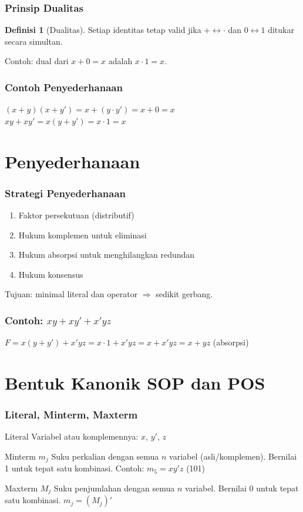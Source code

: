 \documentclass[handout]{beamer}
\theoremstyle{definition}
\newtheorem{definisi}[theorem]{Definisi}
\theoremstyle{example}
\begin{document}
\begin{frame}
\frametitle{Prinsip Dualitas}
\begin{definisi}[Dualitas]
Setiap identitas tetap valid jika $+ \leftrightarrow \cdot$ dan $0 \leftrightarrow 1$ ditukar secara simultan.
\end{definisi}
Contoh: dual dari $x+0=x$ adalah $x \cdot 1 = x$.
\end{frame}

\begin{frame}
\frametitle{Contoh Penyederhanaan}
$(x+y)(x+y') = x + (y \cdot y') = x + 0 = x$\\
$xy + xy' = x(y+y') = x \cdot 1 = x$
\end{frame}

\section{Penyederhanaan}

\begin{frame}
\frametitle{Strategi Penyederhanaan}
\begin{enumerate}
  \item Faktor persekutuan (distributif)
  \item Hukum komplemen untuk eliminasi
  \item Hukum absorpsi untuk menghilangkan redundan
  \item Hukum konsensus
\end{enumerate}
Tujuan: minimal literal dan operator $\Rightarrow$ sedikit gerbang.
\end{frame}

\begin{frame}
\frametitle{Contoh: $xy + xy' + x'yz$}
$F = x(y+y') + x'yz = x \cdot 1 + x'yz = x + x'yz = x + yz$ (absorpsi)
\end{frame}

\section{Bentuk Kanonik SOP dan POS}

\begin{frame}
\frametitle{Literal, Minterm, Maxterm}
\begin{block}{Literal}
Variabel atau komplemennya: $x$, $y'$, $z$
\end{block}
\begin{block}{Minterm $m_j$}
Suku perkalian dengan semua $n$ variabel (asli/komplemen). Bernilai 1 untuk tepat satu kombinasi. Contoh: $m_5 = xy'z$ (101)
\end{block}
\begin{block}{Maxterm $M_j$}
Suku penjumlahan dengan semua $n$ variabel. Bernilai 0 untuk tepat satu kombinasi. $m_j = (M_j)'$
\end{block}
\end{frame}
\end{document}
